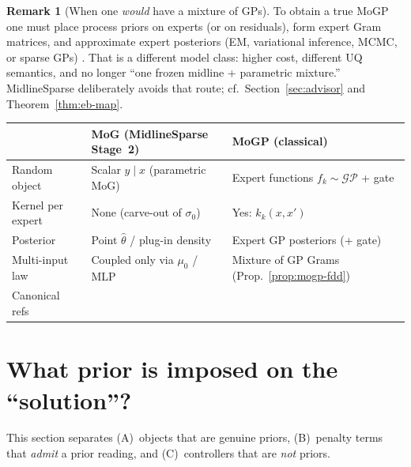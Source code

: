 \documentclass[11pt,a4paper]{article}
\theoremstyle{plain}
\theoremstyle{definition}
\newtheorem{remark}[theorem]{Remark}
\theoremstyle{remark}
\newcommand{\GP}{\mathcal{GP}}
\newcommand{\tht}{\theta}
\begin{document}
\begin{remark}[When one \emph{would} have a mixture of GPs]
To obtain a true MoGP one must place process priors on experts (or on residuals),
form expert Gram matrices, and approximate expert posteriors (EM, variational inference,
MCMC, or sparse GPs)
\citep{Tresp2001,RasmussenGhahramani2001,YuanNeubauer2009}.
That is a different model class: higher cost, different UQ semantics, and no longer
``one frozen midline + parametric mixture.'' MidlineSparse deliberately avoids that
route; cf.\ Section~\ref{sec:advisor} and Theorem~\ref{thm:eb-map}.
\end{remark}

\begin{center}
\begin{tabular}{@{}p{3.4cm}p{5.2cm}p{5.2cm}@{}}
\toprule
& \textbf{MoG (MidlineSparse Stage~2)} & \textbf{MoGP (classical)} \\
\midrule
Random object & Scalar \(y\mid x\) (parametric MoG) &
  Expert functions \(f_k\sim\GP\) + gate \\
Kernel per expert & None (carve-out of \(\sigma_0\)) &
  Yes: \(k_k(x,x')\) \\
Posterior & Point \(\hat\tht\) / plug-in density &
  Expert GP posteriors (+ gate) \\
Multi-input law & Coupled only via \(\mu_0\) / MLP &
  Mixture of GP Grams (Prop.~\ref{prop:mogp-fdd}) \\
Canonical refs &
  \citep{McLachlanPeel2000,Bishop2006} &
  \citep{Tresp2001,RasmussenGhahramani2001} \\
\bottomrule
\end{tabular}
\end{center}

\section{What prior is imposed on the ``solution''?}

This section separates (A)~objects that are genuine priors, (B)~penalty terms that
\emph{admit} a prior reading, and (C)~controllers that are \emph{not} priors.
\end{document}
